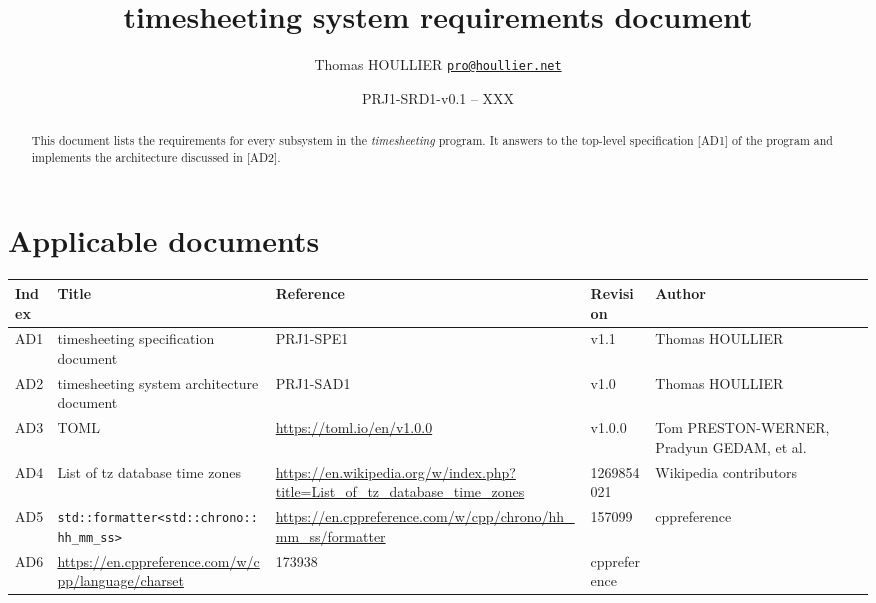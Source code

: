 \documentclass[letterpaper]{article}
\title{timesheeting system requirements document}
\author{Thomas HOULLIER \href{mailto:pro@houllier.net}
         {\texttt{\textlangle pro@houllier.net\textrangle}}}
\begin{document}
\frenchspacing
\date{PRJ1-SRD1-v0.1 -- XXX}
\maketitle
\thispagestyle{FirstPage}

\begin{abstract}
  This document lists the requirements for every subsystem in the
  \emph{timesheeting} program.
  It answers to the top-level specification [AD1] of the program and implements
  the architecture discussed in [AD2].
\end{abstract}

\begin{versionhistory}
\end{versionhistory}
\setcounter{table}{0} %

\section*{Applicable documents}
{ \centering
\begin{tabularx}{\textwidth}{| X | X | X | X | X |} \hline
  Index & Title & Reference & Revision & Author \\ \hline
  AD1   & timesheeting specification document & PRJ1-SPE1 & v1.1 & Thomas
  HOULLIER \\ \hline
  AD2   & timesheeting system architecture document & PRJ1-SAD1 & v1.0 & Thomas
  HOULLIER \\ \hline
  AD3   & TOML & \url{https://toml.io/en/v1.0.0} & v1.0.0 & Tom PRESTON-WERNER,
                                                            Pradyun GEDAM, et
                                                            al. \\ \hline
  AD4   & List of tz database time zones
        & \url{https://en.wikipedia.org/w/index.php?title=List_of_tz_database_time_zones}
                            & 1269854021 & Wikipedia contributors \\ \hline
  AD5   & \lstinline{std::formatter<std::chrono::hh_mm_ss>}
        & \url{https://en.cppreference.com/w/cpp/chrono/hh_mm_ss/formatter}
                            & 157099 & cppreference \\ \hline
  AD6   & \url{https://en.cppreference.com/w/cpp/language/charset}
        & 173938 & cppreference \\
  \hline \end{tabularx} \par }
\end{document}
